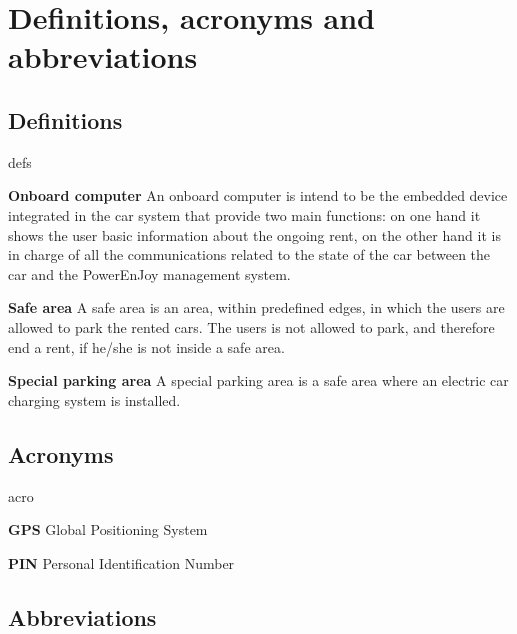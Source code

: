 \section{Definitions, acronyms and abbreviations}

\subsection{Definitions}
	\begin{labeling}{defs}
		\item[\textbf{Onboard computer}] An onboard computer is intend to be the embedded device integrated in the car system that provide two main functions: on one hand it shows the user basic information about the ongoing rent, on the other hand it is in charge of all the communications related to the state of the car between the car and the PowerEnJoy management system.
		\item[\textbf{Safe area}] A safe area is an area, within predefined edges, in which the users are allowed to park the rented cars. The users is not allowed to park, and therefore end a rent, if he/she is not inside a safe area.
		\item[\textbf{Special parking area}] A special parking area is a safe area where an electric car charging system is installed.
	\end{labeling}
\subsection{Acronyms}
	\begin{labeling}{acro}
		\item[\textbf{GPS}] Global Positioning System
		\item[\textbf{PIN}] Personal Identification Number
	\end{labeling}
\subsection{Abbreviations}
